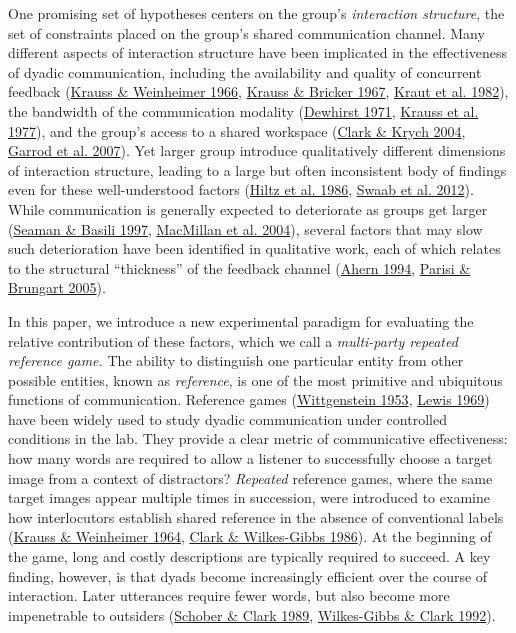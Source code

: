 \documentclass[
  english,
  a4paper,
]{article}
\begin{document}
One promising set of hypotheses centers on the group's \emph{interaction structure}, the set of constraints placed on the group's shared communication channel.
Many different aspects of interaction structure have been implicated in the effectiveness of dyadic communication, including the availability and quality of concurrent feedback (\protect\hyperlink{ref-krauss1966}{Krauss \& Weinheimer 1966}, \protect\hyperlink{ref-KraussBricker67_Delay}{Krauss \& Bricker 1967}, \protect\hyperlink{ref-kraut1982listener}{Kraut et al. 1982}), the bandwidth of the communication modality (\protect\hyperlink{ref-dewhirst1971influence}{Dewhirst 1971}, \protect\hyperlink{ref-KraussEtAl77}{Krauss et al. 1977}), and the group's access to a shared workspace (\protect\hyperlink{ref-clark2004speaking}{Clark \& Krych 2004}, \protect\hyperlink{ref-garrod2007foundations}{Garrod et al. 2007}).
Yet larger group introduce qualitatively different dimensions of interaction structure, leading to a large but often inconsistent body of findings even for these well-understood factors (\protect\hyperlink{ref-hiltz1986experiments}{Hiltz et al. 1986}, \protect\hyperlink{ref-swaab2012communication}{Swaab et al. 2012}).
While communication is generally expected to deteriorate as groups get larger (\protect\hyperlink{ref-seaman1997communication}{Seaman \& Basili 1997}, \protect\hyperlink{ref-macmillan_communication_2004}{MacMillan et al. 2004}), several factors that may slow such deterioration have been identified in qualitative work, each of which relates to the structural ``thickness'' of the feedback channel (\protect\hyperlink{ref-ahern1994effect}{Ahern 1994}, \protect\hyperlink{ref-parisi2005evaluating}{Parisi \& Brungart 2005}).

In this paper, we introduce a new experimental paradigm for evaluating the relative contribution of these factors, which we call a \emph{multi-party repeated reference game.}
The ability to distinguish one particular entity from other possible entities, known as \emph{reference}, is one of the most primitive and ubiquitous functions of communication.
Reference games (\protect\hyperlink{ref-Wittgenstein1953}{Wittgenstein 1953}, \protect\hyperlink{ref-lewis1969convention}{Lewis 1969}) have been widely used to study dyadic communication under controlled conditions in the lab.
They provide a clear metric of communicative effectiveness: how many words are required to allow a listener to successfully choose a target image from a context of distractors?
\emph{Repeated} reference games, where the same target images appear multiple times in succession, were introduced to examine how interlocutors establish shared reference in the absence of conventional labels (\protect\hyperlink{ref-krauss1964}{Krauss \& Weinheimer 1964}, \protect\hyperlink{ref-clark1986}{Clark \& Wilkes-Gibbs 1986}).
At the beginning of the game, long and costly descriptions are typically required to succeed.
A key finding, however, is that dyads become increasingly efficient over the course of interaction.
Later utterances require fewer words, but also become more impenetrable to outsiders (\protect\hyperlink{ref-schober1989}{Schober \& Clark 1989}, \protect\hyperlink{ref-wilkes1992coordinating}{Wilkes-Gibbs \& Clark 1992}).
\end{document}
